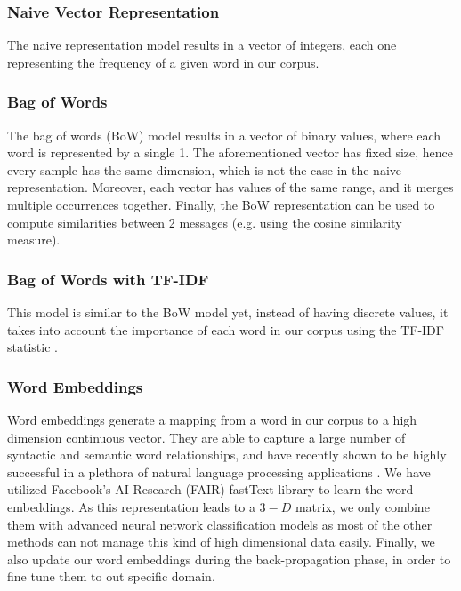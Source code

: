 \documentclass[letterpaper]{article}
\begin{document}
\subsubsection{Naive Vector Representation}  \label{Naive Vector Representation}

The naive representation model results in a vector of integers, each one representing the frequency of a given word in our corpus. 

\subsubsection{Bag of Words}  \label{Bag of Words}

The bag of words (BoW) model results in a vector of binary values, where each word is represented by a single 1. The aforementioned vector has fixed size, hence every sample has the same dimension, which is not the case in the naive representation. Moreover, each vector has values of the same range, and it merges multiple occurrences together. Finally, the BoW representation can be used to compute similarities between 2 messages (e.g. using the cosine similarity measure).

\subsubsection{Bag of Words with TF-IDF}  \label{TFIDF}

This model is similar to the BoW model yet, instead of having discrete values, it takes into account the importance of each word in our corpus using the TF-IDF statistic \cite{salton1988term}.

\subsubsection{Word Embeddings}  \label{Word Embeddings}

Word embeddings generate a mapping from a word in our corpus to a high dimension continuous vector. They are able to capture a large number of syntactic and semantic word relationships, and have recently shown to be highly successful in a plethora of natural language processing applications \cite{mikolov2013distributed} \cite{bojanowski2016enriching}. We have utilized Facebook's AI Research (FAIR) fastText library \cite{bojanowski2016enriching} to learn the word embeddings. As this representation leads to a $3-D$ matrix, we only combine them with advanced neural network classification models as most of the other methods can not manage this kind of high dimensional data easily. Finally, we also update our word embeddings during the back-propagation phase, in order to fine tune them to out specific domain.
\end{document}
